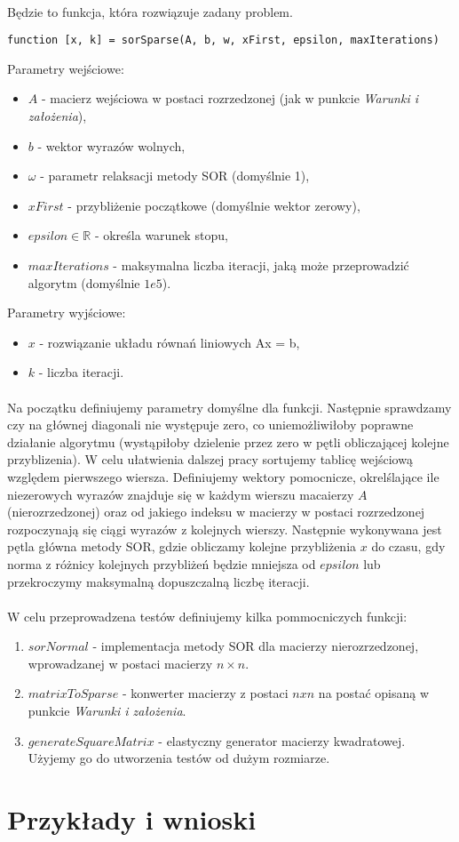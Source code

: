 \documentclass{article}
\begin{document}
\paragraph{}
Będzie to funkcja, która rozwiązuje zadany problem.
\begin{lstlisting}[style=Matlab-editor]
function [x, k] = sorSparse(A, b, w, xFirst, epsilon, maxIterations)
\end{lstlisting}
\vspace{4pt}
Parametry wejściowe:
\begin{itemize}
\item $A$ - macierz wejściowa w postaci rozrzedzonej (jak w punkcie \textit{Warunki i założenia}),
\item $b$ - wektor wyrazów wolnych,
\item $\omega$ - parametr relaksacji metody SOR (domyślnie 1),
\item $xFirst$ - przybliżenie początkowe (domyślnie wektor zerowy),
\item $epsilon\in \mathbb{R}$ - określa warunek stopu,
\item $maxIterations$ - maksymalna liczba iteracji, jaką może przeprowadzić algorytm (domyślnie $1e5$).
\end{itemize}
Parametry wyjściowe:
\begin{itemize}
\item$x$ - rozwiązanie układu równań liniowych Ax = b,
\item$ k$ - liczba iteracji.
\end{itemize}
\paragraph{}
Na początku definiujemy parametry domyślne dla funkcji. Następnie sprawdzamy czy na głównej diagonali nie występuje zero, co uniemożliwiłoby poprawne działanie algorytmu (wystąpiłoby dzielenie przez zero w pętli obliczającej kolejne przyblizenia). W celu ułatwienia dalszej pracy sortujemy tablicę wejściową względem pierwszego wiersza. Definiujemy wektory pomocnicze, okrelślające ile niezerowych wyrazów znajduje się w każdym wierszu macaierzy $A$ (nierozrzedzonej) oraz od jakiego indeksu w macierzy w postaci rozrzedzonej rozpoczynają się ciągi wyrazów z kolejnych wierszy. Następnie wykonywana jest pętla główna metody SOR, gdzie obliczamy kolejne przybliżenia $x$ do czasu, gdy norma z różnicy kolejnych przybliżeń będzie mniejsza od $epsilon$ lub przekroczymy maksymalną dopuszczalną liczbę iteracji.
\paragraph{}
W celu przeprowadzena testów definiujemy kilka pommocniczych funkcji:
\begin{enumerate}
\item $sorNormal$ - implementacja metody SOR dla macierzy nierozrzedzonej, wprowadzanej w postaci macierzy $n\times n$.
\item $matrixToSparse$ - konwerter macierzy z postaci $nxn$ na postać opisaną w punkcie \textit{Warunki i założenia}.
\item $generateSquareMatrix$ - elastyczny generator macierzy kwadratowej. Użyjemy go do utworzenia testów od dużym rozmiarze.
\end{enumerate}
\section{Przykłady i wnioski}
\end{document}
